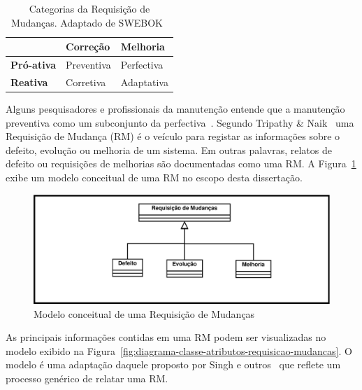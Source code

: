 \begin{table}[htpb] \centering 	\begin{tabular}{l|l|l|} \cline{2-3} &
		\textbf{Correção} & \textbf{Melhoria} \\ \hline
		\multicolumn{1}{|l|}{\textbf{Pró-ativa}} & Preventiva & Perfectiva \\
		\hline \multicolumn{1}{|l|}{\textbf{Reativa}} & Corretiva & Adaptativa
		\\ \hline \end{tabular}\caption{Categorias da Requisição de Mudanças.
		Adaptado de
		SWEBOK~\cite{4425813}}\label{tab:categorias_requisicao_mudanca}
\end{table}

Alguns pesquisadores e profissionais da manutenção entende que a manutenção
preventiva como um subconjunto da perfectiva~\cite{thipathy2014software}.
Segundo Tripathy \& Naik~\cite{tripathy2014software} uma Requisição de Mudança
(RM) é o veículo para registar as informações sobre o defeito, evolução ou
melhoria de um sistema. Em outras palavras, relatos de defeito ou requisições de
melhorias são documentadas como uma RM. A
Figura~\ref{fig:diagrama-classe-requisicao-mudancas} exibe um modelo conceitual
de uma RM no escopo desta dissertação.

\begin{figure}[htpb]
	\centering
	\includegraphics[width=0.8\linewidth]{./chapter-manutencao-software-visao-geral/img/diagrama-classe-conceitual-requisicao-mudancas.pdf}
	\caption{Modelo conceitual de uma Requisição de Mudanças}
	\label{fig:diagrama-classe-requisicao-mudancas}
\end{figure}
\todoend

As principais informações contidas em uma RM podem ser visualizadas no modelo
exibido na Figura~\ref{fig:diagrama-classe-atributos-requisicao-mudancas}. O
modelo é uma adaptação daquele proposto por Singh e outros~\cite{singh2011bug}
que reflete um processo genérico de relatar uma RM.

